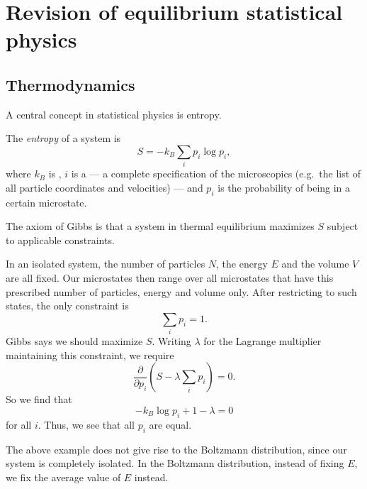 \documentclass[a4paper]{article}
\begin{document}
\section{Revision of equilibrium statistical physics}
\subsection{Thermodynamics}
A central concept in statistical physics is entropy.

\begin{defi}[Entropy]
  The \emph{entropy} of a system is
  \[
    S = - k_B \sum_i p_i \log p_i,
  \]
  where $k_B$ is , $i$ is a  --- a complete specification of the microscopics (e.g.\ the list of all particle coordinates and velocities) --- and $p_i$ is the probability of being in a certain microstate.
\end{defi}

The axiom of Gibbs is that a system in thermal equilibrium maximizes $S$ subject to applicable constraints.
\begin{eg}
  In an isolated system, the number of particles $N$, the energy $E$ and the volume $V$ are all fixed. Our microstates then range over all microstates that have this prescribed number of particles, energy and volume only. After restricting to such states, the only constraint is
  \[
    \sum_i p_i = 1.
  \]
  Gibbs says we should maximize $S$. Writing $\lambda$ for the Lagrange multiplier maintaining this constraint, we require
  \[
    \frac{\partial}{\partial p_i} \left(S - \lambda \sum_i p_i\right) = 0.
  \]
  So we find that
  \[
    -k_B \log p_i + 1 - \lambda = 0
  \]
  for all $i$. Thus, we see that all $p_i$ are equal.
\end{eg}
The above example does not give rise to the Boltzmann distribution, since our system is completely isolated. In the Boltzmann distribution, instead of fixing $E$, we fix the average value of $E$ instead.
\end{document}
